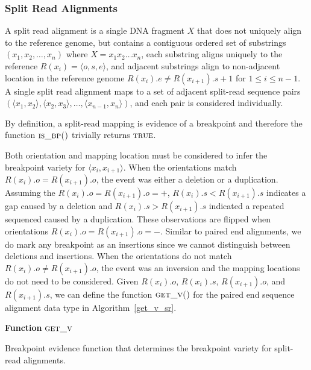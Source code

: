 \documentclass[11pt]{article}
\begin{document}


\subsubsection{Split Read Alignments}

A split read alignment is a single DNA fragment $X$ that does not uniquely align
to the reference genome, but contains a contiguous ordered set of substrings
$(x_1, x_2, \dots, x_n)$ where $X=x_1x_2\dots x_n$, each substring aligns
uniquely to the reference $R(x_i)=\langle o,s,e \rangle$, and adjacent
substrings align to non-adjacent location in the reference genome
$R(x_{i}).e \neq R(x_{i+1}).s + 1$ for $1\leq i \leq n-1$. A single split read
alignment maps to a set of adjacent split-read sequence pairs 
$(\langle x_1 , x_2 \rangle, \langle x_2, x_3 \rangle, \dots ,
\langle x_{n-1},x_n \rangle)$, and each pair is considered individually.

By definition, a split-read mapping is evidence of a breakpoint and therefore
the function $\textsc{is\_bp()}$ trivially returns $\textsc{true}$.

Both orientation and mapping location must be considered to infer the breakpoint
variety for $\langle x_i,x_{i+1} \rangle$.  When the orientations match
$R(x_{i}).o=R(x_{i+1}).o$, the event was either a deletion or
a duplication.  Assuming the $R(x_{i}).o=R(x_{i+1}).o=+$, 
$R(x_{i}).s<R(x_{i+1}).s$ indicates a gap caused by a deletion and 
$R(x_{i}).s>R(x_{i+1}).s$ indicated a repeated sequenced caused by a
duplication.   These observations are flipped when orientations
$R(x_{i}).o=R(x_{i+1}).o=-$.  Similar to paired end alignments, we do mark any
breakpoint as an insertions since we cannot distinguish between deletions and
insertions.  When the orientations do not match $R(x_{i}).o \ne R(x_{i+1}).o$,
the event was an inversion and the mapping locations do not need to be
considered.  Given $R(x_i).o$, $R(x_i).s$, $R(x_{i+1}).o$, and $R(x_{i+1}).s$,
we can define the function $\textsc{get\_v()}$ for the paired end sequence
alignment data type in Algorithm~\ref{get_v_sr}.

\begin{algorithm}[H]
    \DontPrintSemicolon
    \footnotesize
    \BlankLine
    \textbf{Function} $\textsc{get\_v}$\;
	\caption{Breakpoint evidence function that determines the breakpoint variety
			 for split-read alignments.}
    \label{get_v_sr}
\end{algorithm}
\end{document}
